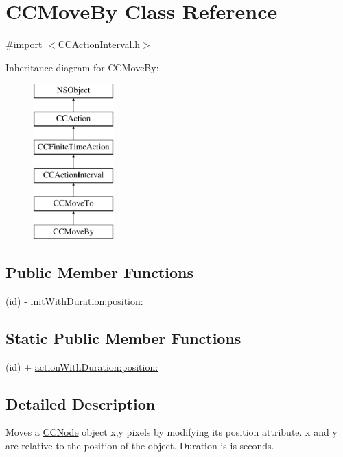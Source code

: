 \hypertarget{interface_c_c_move_by}{\section{C\-C\-Move\-By Class Reference}
\label{interface_c_c_move_by}
}


{\ttfamily \#import $<$C\-C\-Action\-Interval.\-h$>$}

Inheritance diagram for C\-C\-Move\-By\-:\begin{figure}[H]
\begin{center}
\leavevmode
\includegraphics[height=6.000000cm]{interface_c_c_move_by}
\end{center}
\end{figure}
\subsection*{Public Member Functions}
\begin{DoxyCompactItemize}
\item 
(id) -\/ \hyperlink{interface_c_c_move_by_a3599d5ef2b434522b459b69c6cb8fce0}{init\-With\-Duration\-:position\-:}
\end{DoxyCompactItemize}
\subsection*{Static Public Member Functions}
\begin{DoxyCompactItemize}
\item 
(id) + \hyperlink{interface_c_c_move_by_a7c60ceda09f1cb73515b8400a0392f51}{action\-With\-Duration\-:position\-:}
\end{DoxyCompactItemize}


\subsection{Detailed Description}
Moves a \hyperlink{class_c_c_node}{C\-C\-Node} object x,y pixels by modifying its position attribute. x and y are relative to the position of the object. Duration is is seconds. 

